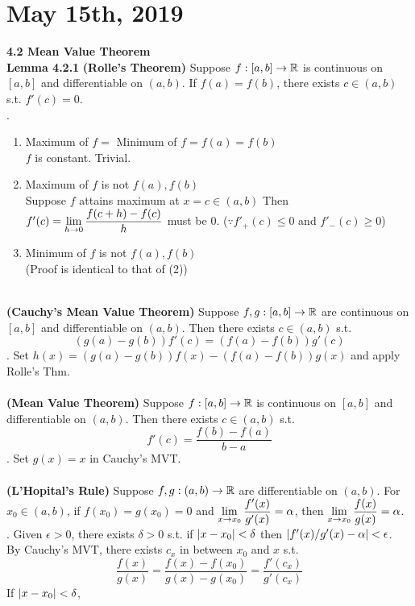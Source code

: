 \section*{May 15th, 2019}
\textbf{4.2 Mean Value Theorem}\\
\textbf{Lemma 4.2.1} \textbf{(Rolle's Theorem)} Suppose $f:[a, b]\rightarrow \mathbb{R}$ is continuous on $[a, b]$ and differentiable on $(a, b)$. If $f(a) = f(b)$, there exists $c \in (a, b)$ s.t. $f'(c) = 0$.\\
\pf.
\begin{enumerate}
	\item Maximum of $f = $ Minimum of $f =f(a) = f(b)$ \\
	$f$ is constant. Trivial.
	\item Maximum of $f$ is not $f(a), f(b)$\\
	Suppose $f$ attains maximum at $x = c \in (a, b)$ Then $f'(c) = \displaystyle\lim_{h\rightarrow 0}\frac{f(c+h)-f(c)}{h}$ must be 0. ($\because f'_+(c) \leq 0$ and $f'_-(c) \geq 0$)
	\item Minimum of $f$ is not $f(a), f(b)$\\
	(Proof is identical to that of (2))
\end{enumerate}~\\
 \textbf{(Cauchy's Mean Value Theorem)} Suppose $f, g:[a, b]\rightarrow \mathbb{R}$ are continuous on $[a, b]$ and differentiable on $(a, b)$. Then there exists $c\in (a, b)$ s.t. $$(g(a) - g(b))f'(c) = (f(a) - f(b))g'(c)$$
\pf. Set $h(x) = (g(a) - g(b))f(x) - (f(a)-f(b))g(x)$ and apply Rolle's Thm.\\
\\
 \textbf{(Mean Value Theorem)} Suppose $f :[a, b]\rightarrow \mathbb{R}$ is continuous on $[a, b]$ and differentiable on $(a, b)$. Then there exists $c\in (a, b)$ s.t. $$f'(c) = \frac{f(b)-f(a)}{b - a}$$
\pf. Set $g(x) = x$ in Cauchy's MVT.\\
\\
 \textbf{(L'Hopital's Rule)} Suppose $f, g:(a, b)\rightarrow \mathbb{R}$ are differentiable on $(a, b)$. For $x_0\in (a, b)$, if $f(x_0) = g(x_0) = 0$ and $\displaystyle\lim_{x\rightarrow x_0} \frac{f'(x)}{g'(x)} = \alpha$, then $\displaystyle\lim_{x\rightarrow x_0}\frac{f(x)}{g(x)}=\alpha$.\\
\pf. Given $\epsilon > 0$, there exists $\delta > 0$ s.t. if $\left|x - x_0\right| < \delta$ then $\left|f'(x) / g'(x) - \alpha\right| < \epsilon$.\\ By Cauchy's MVT, there exists $c_x$ in between $x_0$ and $x$ s.t. $$\frac{f(x)}{g(x)} = \frac{f(x) - f(x_0)}{g(x) - g(x_0)} = \frac{f'(c_x)}{g'(c_x)}$$
If $\left|x - x_0\right| < \delta$, 

